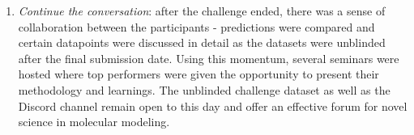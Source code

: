\documentclass[journal=jcim,manuscript=article]{achemso}
\begin{document}
\begin{enumerate}
    \item \textit{Continue the conversation}: after the challenge ended, there was a sense of collaboration between the participants - predictions were compared and certain datapoints were discussed in detail as the datasets were unblinded after the final submission date. Using this momentum, several seminars were hosted where top performers were given the opportunity to present their methodology and learnings. The unblinded challenge dataset as well as the Discord channel remain open to this day and offer an effective forum for novel science in molecular modeling.
\end{enumerate}


\end{document}
